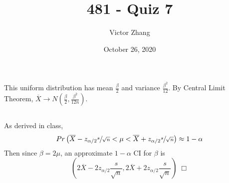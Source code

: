 \documentclass{article}
\title{481 - Quiz 7}
\author{Victor Zhang}
\date{October 26, 2020}
\begin{document}
\maketitle

\section{}
\subsection{}
This uniform distribution has mean $\frac{\beta}{2}$ and variance $\frac{\beta^2}{12}$. By Central Limit Theorem, $\overline{X} \rightarrow N(\frac{\beta}{2}, \frac{\beta^2}{12n})$.
\subsection{}
As derived in class,
$$Pr\left( \overline{X} - z_{\alpha/2}\sfrac{s}{\sqrt{n}} < \mu < \overline{X} + z_{\alpha/2}\sfrac{s}{\sqrt{n}} \right) \approx 1 - \alpha$$
Then since $\beta = 2\mu$, an approximate $1-\alpha$ CI for $\beta$ is
$$\left( 2\overline{X} - 2z_{\alpha/2}\frac{s}{\sqrt{n}}, 2\overline{X} + 2z_{\alpha/2}\frac{s}{\sqrt{n}} \right) \;\Box$$
\end{document}
